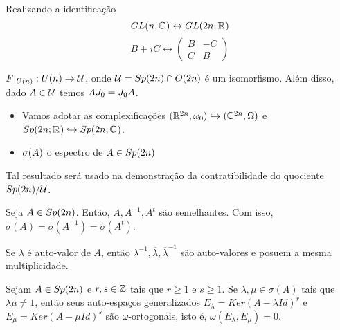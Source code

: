 \documentclass{beamer}
\begin{document}
	\begin{frame}
		Realizando a identificação
		$$
		GL(n, \mathbb{C}^{})\leftrightarrow GL(2n, \mathbb{R}^{})
		$$
		$$
		B+iC \leftrightarrow
		\left(
		\begin{array}{cc}
		B & -C
		\\
		C & B
		\end{array}
		\right)
		$$  
		\begin{lema}
			$F|_{U(n)}: U(n) \to \mathcal{U} $, onde $\mathcal{U}  = Sp(2n)\cap O(2n)$ é um isomorfismo. Além disso, dado $A \in \mathcal{U} $ temos $AJ_{0}=J_{0} A$.
		\end{lema}
	\end{frame}
	
	\begin{frame}
		\begin{itemize}
			\item Vamos adotar as complexificações $(\mathbb{R}^{2n}, \omega_{0}) \hookrightarrow (\mathbb{C}^{2n}, \Omega)$ e $Sp(2n;\mathbb{R}^{}) \hookrightarrow Sp(2n; \mathbb{C}^{})$. 
			
			\item $\sigma(A)$ o espectro de $A \in Sp(2n)$ 
		\end{itemize}	
		
		\begin{tiny}
			Tal resultado será usado na demonstração da contratibilidade do quociente $Sp(2n)/\mathcal{U}$.
			
		\end{tiny}
		\begin{lema}
			Seja $A \in Sp(2n)$. Então, $A, A^{-1}, A^{t}$ são semelhantes. Com isso, $\sigma(A) = \sigma(A^{-1}) = \sigma(A^{t}) $.
		\end{lema}
		
		\begin{tiny}
			Se $\lambda$ é auto-valor de $A$, então $\lambda^{-1}, \overline{\lambda}, \overline{\lambda}^{-1}$ são auto-valores e posuem a mesma multiplicidade.
		\end{tiny}
		
		\begin{lema}
			Sejam $A \in Sp(2n)$ e $r,s \in \mathbb{Z}$ tais que $r\geq 1$ e $s\geq 1$. Se $\lambda, \mu \in \sigma(A)$ tais que $\lambda\mu \neq 1$, então seus auto-espaços generalizados $E_{\lambda}=Ker(A-\lambda Id)^{r}$ e  $E_{\mu}=Ker(A-\mu Id)^{s}$ são $\omega$-ortogonais, isto é, $\omega(E_{\lambda}, E_{\mu}) = 0$.
		\end{lema}
		
	\end{frame}
	
\end{document}
